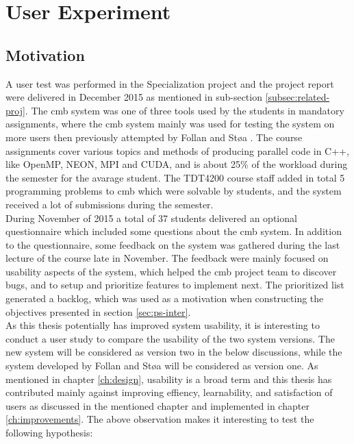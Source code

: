 \section{User Experiment}
\label{sec:user-testing}

\subsection{Motivation}
A user test was performed in the Specialization project and the project report were delivered in December 2015 as mentioned in sub-section \ref{subsec:related-proj}. The \gls{cmb} system was one of three tools used by the students in mandatory assignments, where the \gls{cmb} system mainly was used for testing the system on more users then previously attempted by Follan and Støa \cite{mt:T&S}. The course assignments cover various topics and methods of producing parallel code in C++, like OpenMP, NEON, MPI and CUDA, and is about 25\% of the workload during the semester for the avarage student. The TDT4200 course staff added in total 5 programming problems to \gls{cmb} which were solvable by students, and the system received a lot of submissions during the semester. \\

During November of 2015 a total of 37 students delivered an optional questionnaire which included some questions about the \gls{cmb} system. In addition to the questionnaire, some feedback on the system was gathered during the last lecture of the course late in November. The feedback were mainly focused on usability aspects of the system, which helped the \gls{cmb} project team to discover bugs, and to setup and prioritize features to implement next. The prioritized list generated a backlog, which was used as a motivation when constructing the objectives presented in section \ref{sec:ps-inter}. \\

As this thesis potentially has improved system usability, it is interesting to conduct a user study to compare the usability of the two system versions. The new system will be considered as version two in the below discussions, while the system developed by Follan and Støa will be considered as version one. As mentioned in chapter \ref{ch:design}, usability is a broad term and this thesis has contributed mainly against improving effiency, learnability, and satisfaction of users as discussed in the mentioned chapter and implemented in chapter \ref{ch:improvements}. The above observation makes it interesting to test the following hypothesis:

